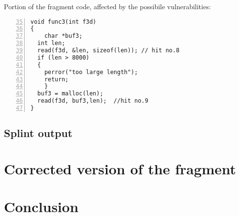 \documentclass[a4paper,12pt]{article}
\begin{document}
\noindent
Portion of the fragment code, affected by the possibile vulnerabilities:
\begin{lstlisting}[style=c,numbers=left,firstnumber=35,linebackgroundcolor={
\ifnum\value{lstnumber}=39\color{green}\fi
\ifnum\value{lstnumber}=46\color{red}\fi}]
void func3(int f3d)
{
	char *buf3;
  int len;
  read(f3d, &len, sizeof(len)); // hit no.8
  if (len > 8000) 
  { 
  	perror("too large length");
  	return; 
	}
  buf3 = malloc(len);
  read(f3d, buf3,len);	//hit no.9
}
\end{lstlisting}




\subsection{Splint output}

\section{Corrected version of the fragment}



\section{Conclusion}





\end{document}
